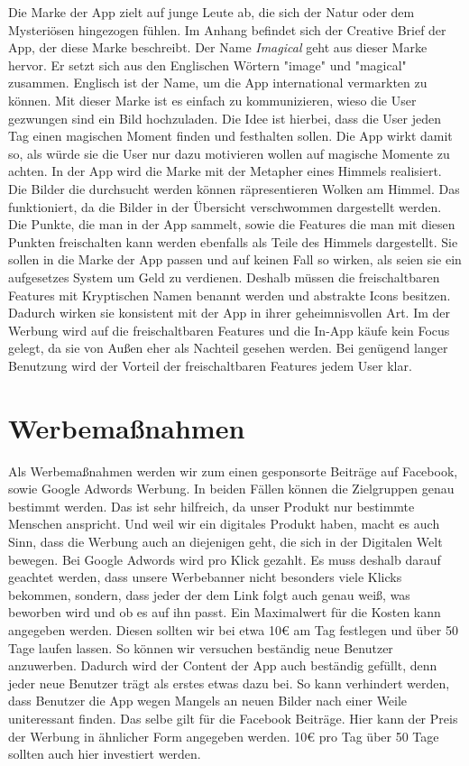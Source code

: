 Die Marke der App zielt auf junge Leute ab, die sich der Natur oder dem Mysteriösen hingezogen fühlen. Im Anhang befindet sich der Creative Brief der App, der diese Marke beschreibt.
Der Name \textit{Imagical} geht aus dieser Marke hervor. Er setzt sich aus den Englischen Wörtern "image" und "magical" zusammen. Englisch ist der Name, um die App international vermarkten zu können.
Mit dieser Marke ist es einfach zu kommunizieren, wieso die User gezwungen sind ein Bild hochzuladen. Die Idee ist hierbei, dass die User jeden Tag einen magischen Moment finden und festhalten sollen. Die App wirkt damit so, als würde sie die User nur dazu motivieren wollen auf magische Momente zu achten.
In der App wird die Marke mit der Metapher eines Himmels realisiert. Die Bilder die durchsucht werden können räpresentieren Wolken am Himmel. Das funktioniert, da die Bilder in der Übersicht verschwommen dargestellt werden. Die Punkte, die man in der App sammelt, sowie die Features die man mit diesen Punkten freischalten kann werden ebenfalls als Teile des Himmels dargestellt. Sie sollen in die Marke der App passen und auf keinen Fall so wirken, als seien sie ein aufgesetzes System um Geld zu verdienen. Deshalb müssen die freischaltbaren Features mit Kryptischen Namen benannt werden und abstrakte Icons besitzen. Dadurch wirken sie konsistent mit der App in ihrer geheimnisvollen Art.
Im der Werbung wird auf die freischaltbaren Features und die In-App käufe kein Focus gelegt, da sie von Außen eher als Nachteil gesehen werden. Bei genügend langer Benutzung wird der Vorteil der freischaltbaren Features jedem User klar.

\section{Werbemaßnahmen}

Als Werbemaßnahmen werden wir zum einen gesponsorte Beiträge auf Facebook, sowie Google Adwords Werbung. In beiden Fällen können die Zielgruppen genau bestimmt werden. Das ist sehr hilfreich, da unser Produkt nur bestimmte Menschen anspricht. Und weil wir ein digitales Produkt haben, macht es auch Sinn, dass die Werbung auch an diejenigen geht, die sich in der Digitalen Welt bewegen.
Bei Google Adwords wird pro Klick gezahlt. Es muss deshalb darauf geachtet werden, dass unsere Werbebanner nicht besonders viele Klicks bekommen, sondern, dass jeder der dem Link folgt auch genau weiß, was beworben wird und ob es auf ihn passt. Ein Maximalwert für die Kosten kann angegeben werden. Diesen sollten wir bei etwa 10€ am Tag festlegen und über 50 Tage laufen lassen. So können wir versuchen beständig neue Benutzer anzuwerben. Dadurch wird der Content der App auch beständig gefüllt, denn jeder neue Benutzer trägt als erstes etwas dazu bei. So kann verhindert werden, dass Benutzer die App wegen Mangels an neuen Bilder nach einer Weile uniteressant finden.
Das selbe gilt für die Facebook Beiträge. Hier kann der Preis der Werbung in ähnlicher Form angegeben werden. 10€ pro Tag über 50 Tage sollten auch hier investiert werden.

